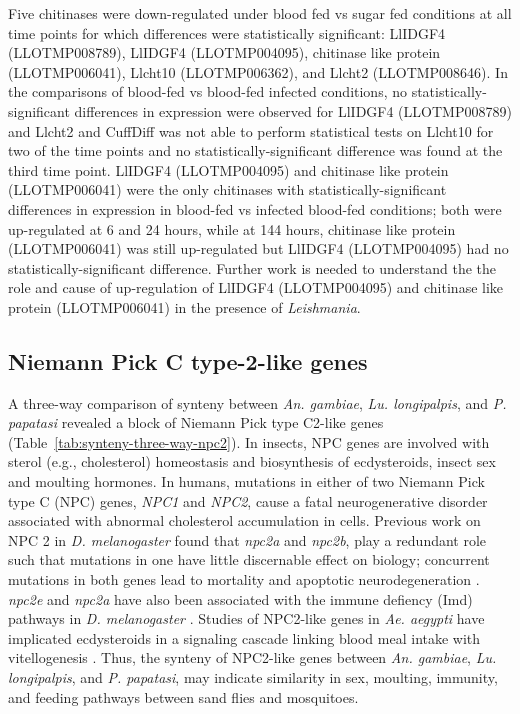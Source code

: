 Five chitinases were down-regulated under blood fed vs sugar fed conditions at all time points for which differences were statistically significant: LlIDGF4 (LLOTMP008789), LlIDGF4 (LLOTMP004095), chitinase like protein (LLOTMP006041), Llcht10 (LLOTMP006362), and Llcht2 (LLOTMP008646).  In the comparisons of blood-fed vs blood-fed infected conditions, no statistically-significant differences in expression were observed for LlIDGF4 (LLOTMP008789) and Llcht2 and CuffDiff was not able to perform statistical tests on Llcht10 for two of the time points and no statistically-significant difference was found at the third time point. LlIDGF4 (LLOTMP004095) and chitinase like protein (LLOTMP006041) were the only chitinases with statistically-significant differences in expression in blood-fed vs infected blood-fed conditions; both were up-regulated at 6 and 24 hours, while at 144 hours, chitinase like protein (LLOTMP006041) was still up-regulated but LlIDGF4 (LLOTMP004095) had no statistically-significant difference. Further work is needed to understand the the role and cause of up-regulation of LlIDGF4 (LLOTMP004095) and chitinase like protein (LLOTMP006041) in the presence of \emph{Leishmania}.

\subsection{Niemann Pick C type-2-like genes}
A three-way comparison of synteny between \emph{An. gambiae}, \emph{Lu. longipalpis}, and \emph{P. papatasi} revealed a block of Niemann Pick type C2-like genes (Table~\ref{tab:synteny-three-way-npc2}). In insects, NPC genes are involved with sterol (e.g., cholesterol) homeostasis and biosynthesis of ecdysteroids, insect sex and moulting hormones. In humans, mutations in either of two Niemann Pick type C (NPC) genes, \emph{NPC1} and \emph{NPC2}, cause a fatal neurogenerative disorder associated with abnormal cholesterol accumulation in cells.  Previous work on NPC 2 in \emph{D. melanogaster} found that \emph{npc2a} and \emph{npc2b}, play a redundant role such that mutations in one have little discernable effect on biology; concurrent mutations in both genes lead to mortality and apoptotic neurodegeneration \cite{Huang2007}.  \emph{npc2e} and \emph{npc2a} have also been associated with the immune defiency (Imd) pathways in \emph{D. melanogaster} \cite{Shi2012}. Studies of NPC2-like genes in \emph{Ae. aegypti} have implicated ecdysteroids in a signaling cascade linking blood meal intake with vitellogenesis \cite{Sirot2011}.  Thus, the synteny of NPC2-like genes between \emph{An. gambiae}, \emph{Lu. longipalpis}, and \emph{P. papatasi}, may indicate similarity in sex, moulting, immunity, and feeding pathways between sand flies and mosquitoes.

